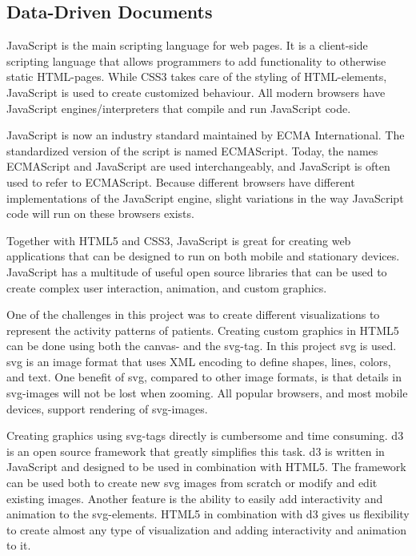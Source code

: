 \subsection{Data-Driven Documents}
JavaScript is the main scripting language for web pages. It is a client-side scripting language that allows programmers to add functionality to otherwise static HTML-pages. While CSS3 takes care of the styling of HTML-elements, JavaScript is used to create customized behaviour. All modern browsers have JavaScript engines/interpreters that compile and run JavaScript code.

JavaScript is now an industry standard maintained by ECMA International. The standardized version of the script is named ECMAScript. Today, the names ECMAScript and JavaScript are used interchangeably, and JavaScript is often used to refer to ECMAScript. Because different browsers have different implementations of the JavaScript engine, slight variations in the way JavaScript code will run on these browsers exists.

Together with HTML5 and CSS3, JavaScript is great for creating web applications that can be designed to run on both mobile and stationary devices. JavaScript has a multitude of useful open source libraries that can be used to create complex user interaction, animation, and custom graphics.

One of the challenges in this project was to create different visualizations to represent the activity patterns of patients. Creating custom graphics in HTML5 can be done using both the canvas- and the svg-tag. In this project \gls{svg} is used. \gls{svg} is an image format that uses XML encoding to define shapes, lines, colors, and text. One benefit of svg, compared to other image formats, is that details in \gls{svg}-images will not be lost when zooming. All popular browsers, and most mobile devices, support rendering of \gls{svg}-images.

Creating graphics using svg-tags directly is cumbersome and time consuming. \gls{d3} is an open source framework that greatly simplifies this task. \gls{d3} is written in JavaScript and designed to be used in combination with HTML5. The framework can be used both to create new \gls{svg} images from scratch or modify and edit existing images. Another feature is the ability to easily add interactivity and animation to the \gls{svg}-elements. HTML5 in combination with \gls{d3} gives us flexibility to create almost any type of visualization and adding interactivity and animation to it.

